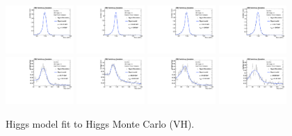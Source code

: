 \begin{figure}[thb]
  \centering
\includegraphics[width=0.23\textwidth]{figures/sec-signals/HiggsShapes/vh_HM_signal_fit_mgg_cat0.pdf}
\includegraphics[width=0.23\textwidth]{figures/sec-signals/HiggsShapes/vh_HM_signal_fit_mgg_cat1.pdf}
\includegraphics[width=0.23\textwidth]{figures/sec-signals/HiggsShapes/vh_LM_signal_fit_mgg_cat0.pdf}
\includegraphics[width=0.23\textwidth]{figures/sec-signals/HiggsShapes/vh_LM_signal_fit_mgg_cat1.pdf}
\includegraphics[width=0.23\textwidth]{figures/sec-signals/HiggsShapes/vh_HM_signal_fit_mjj_cat0.pdf}
\includegraphics[width=0.23\textwidth]{figures/sec-signals/HiggsShapes/vh_HM_signal_fit_mjj_cat1.pdf}
\includegraphics[width=0.23\textwidth]{figures/sec-signals/HiggsShapes/vh_LM_signal_fit_mjj_cat0.pdf}
\includegraphics[width=0.23\textwidth]{figures/sec-signals/HiggsShapes/vh_LM_signal_fit_mjj_cat1.pdf}
  \caption{Higgs model fit to Higgs Monte Carlo (VH).}
  \label{fig:higgs_fit_vh}
\end{figure}

